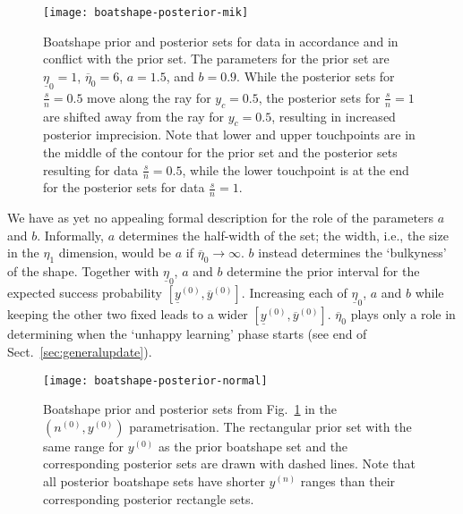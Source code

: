 \documentclass[runningheads,a4paper]{llncs}
\newcommand{\uz}{^{(0)}} %
\newcommand{\un}{^{(n)}} %
\newcommand{\ul}[1]{\underline{#1}}
\newcommand{\ol}[1]{\overline{#1}}
\def\yz{y\uz}
\def\yn{y\un}
\def\yzl{\ul{y}\uz}
\def\yzu{\ol{y}\uz}
\def\nz{n\uz}
\def\ezl{\ul{\eta}_0}
\def\ezu{\ol{\eta}_0}
\begin{document}
\begin{figure}  %
\centering
\texttt{[image: boatshape-posterior-mik]}%
\caption[Boatshape prior and posterior sets for data in accordance and in conflict with the prior set.]%
{Boatshape prior and posterior sets for data in accordance and in conflict with the prior set.
The parameters for the prior set are $\ezl=1$, $\ezu=6$, $a=1.5$, and $b=0.9$.
While the posterior sets for $\frac{s}{n}=0.5$ move along the ray for $y_c=0.5$,
the posterior sets for $\frac{s}{n}=1$ are shifted away from the ray for $y_c=0.5$,
resulting in increased posterior imprecision.
Note that lower and upper touchpoints are in the middle of the contour
for the prior set and the posterior sets resulting for data $\frac{s}{n}=0.5$,
while the lower touchpoint is at the end for the posterior sets for data $\frac{s}{n}=1$.}
\label{fig:boatshape-posterior-mik}
\end{figure}

We have as yet no appealing formal description for the role of the parameters $a$ and $b$. %
Informally, $a$ determines the half-width of the set;
the width, i.e., the size in the $\eta_1$ dimension, would be $a$ if $\ezu \to \infty$.
$b$ instead determines the `bulkyness' of the shape.
Together with $\ezl$, $a$ and $b$ determine the prior interval for the expected success probability $[\yzl, \yzu]$.
Increasing each of $\ezl$, $a$ and $b$ while keeping the other two fixed leads to a wider $[\yzl, \yzu]$.
$\ezu$ plays only a role in determining when the `unhappy learning' phase starts
(see end of Sect.~\ref{sec:generalupdate}).
\begin{figure}  %
\centering
\texttt{[image: boatshape-posterior-normal]}%
\caption[Boatshape prior and posterior sets from Fig.~\ref{fig:boatshape-posterior-mik} in the $(\nz,\yz)$ parametrisation.]%
{Boatshape prior and posterior sets from Fig.~\ref{fig:boatshape-posterior-mik} in the $(\nz,\yz)$ parametrisation.
The rectangular prior set with the same range for $\yz$ as the prior boatshape set
and the corresponding posterior sets are drawn with dashed lines. 
Note that all posterior boatshape sets have shorter $\yn$ ranges than their corresponding posterior rectangle sets.}
\label{fig:boatshape-posterior-normal}
\end{figure}
\end{document}
